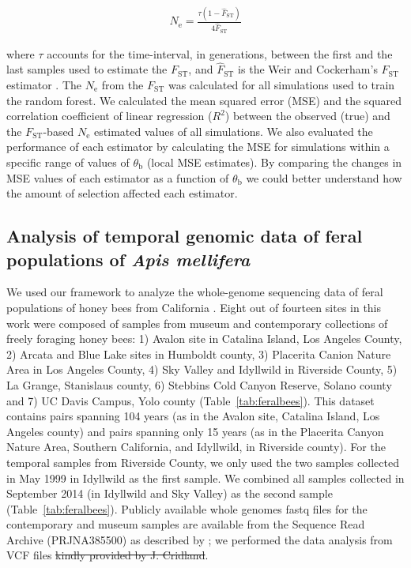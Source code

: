 \documentclass[a4paper, 12pt]{article}
\providecommand{\DIFaddtex}[1]{{\protect\color{blue}\uwave{#1}}} %
\providecommand{\DIFdeltex}[1]{{\protect\color{red}\sout{#1}}}                      %
\providecommand{\DIFaddbegin}{} %
\providecommand{\DIFaddend}{} %
\providecommand{\DIFdelbegin}{} %
\providecommand{\DIFdelend}{} %
\providecommand{\DIFadd}[1]{\texorpdfstring{\DIFaddtex{#1}}{#1}} %
\providecommand{\DIFdel}[1]{\texorpdfstring{\DIFdeltex{#1}}{}} %
\newcommand{\DIFscaledelfig}{0.5}
\newlength{\DIFdelgraphicswidth} %
\newlength{\DIFdelgraphicsheight} %
\newcommand{\DIFaddincludegraphics}[2][]{{\color{blue}\fbox{\DIFOincludegraphics[#1]{#2}}}} %
\newcommand{\DIFdelincludegraphics}[2][]{%
\sbox{\DIFdelgraphicsbox}{\DIFOincludegraphics[#1]{#2}}%
\settoboxwidth{\DIFdelgraphicswidth}{\DIFdelgraphicsbox} %
\settoboxtotalheight{\DIFdelgraphicsheight}{\DIFdelgraphicsbox} %
\scalebox{\DIFscaledelfig}{%
\parbox[b]{\DIFdelgraphicswidth}{\usebox{\DIFdelgraphicsbox}\\[-\baselineskip] \rule{\DIFdelgraphicswidth}{0em}}\llap{\resizebox{\DIFdelgraphicswidth}{\DIFdelgraphicsheight}{%
\setlength{\unitlength}{\DIFdelgraphicswidth}%
\begin{picture}(1,1)%
\thicklines\linethickness{2pt} %
{\color[rgb]{1,0,0}\put(0,0){\framebox(1,1){}}}%
{\color[rgb]{1,0,0}\put(0,0){\line( 1,1){1}}}%
{\color[rgb]{1,0,0}\put(0,1){\line(1,-1){1}}}%
\end{picture}%
}\hspace*{3pt}}} %
} %
\DeclareRobustCommand{\DIFaddbegin}{\DIFOaddbegin \let\includegraphics\DIFaddincludegraphics} %
\DeclareRobustCommand{\DIFaddend}{\DIFOaddend \let\includegraphics\DIFOincludegraphics} %
\DeclareRobustCommand{\DIFdelbegin}{\DIFOdelbegin \let\includegraphics\DIFdelincludegraphics} %
\DeclareRobustCommand{\DIFdelend}{\DIFOaddend \let\includegraphics\DIFOincludegraphics} %
\begin{document}
\begin{gather*}
\hat N_\mathrm{e} = \frac{\tau(1-\hat F_\mathrm{ST})}{4\hat F_\mathrm{ST} } 
\end{gather*}

\noindent where $\tau$ accounts for the time-interval, in generations, between the first and the last samples used to estimate the $F_\mathrm{ST}$, and $\hat F_\mathrm{ST}$ is the Weir and Cockerham's $F_\mathrm{ST}$ estimator \citep{Weir:1984dx}. The $N_\mathrm{e}$ from the $F_\mathrm{ST}$ was calculated for all simulations used to train the random forest. We calculated the mean squared error (MSE) and the squared correlation coefficient of linear regression ($R^2$) between the observed (true) and the $F_\mathrm{ST}$-based $N_\mathrm{e}$ estimated values of all simulations. We also evaluated the performance of each estimator by calculating the MSE for simulations within a specific range of values of $\theta_\mathrm{b}$ (local MSE estimates). By comparing the changes in MSE values of each estimator as a function of $\theta_\mathrm{b}$ we could better understand how the amount of selection affected each estimator.

\subsection*{Analysis of temporal genomic data of feral populations of \textit{Apis mellifera}} 

We used our framework to analyze the whole-genome sequencing data of feral populations of honey bees from California \citep{Cridland:2018fx}. Eight out of fourteen sites in this work were composed of samples from museum and contemporary collections of freely foraging honey bees: 1) Avalon site in Catalina Island, Los Angeles County, 2) Arcata and Blue Lake sites in Humboldt county, 3) Placerita Canion Nature Area in Los Angeles County, 4) Sky Valley and Idyllwild in Riverside County, 5) La Grange, Stanislaus county, 6) Stebbins Cold Canyon Reserve, Solano county and 7) UC Davis Campus, Yolo county (Table~\ref{tab:feralbees}). This dataset contains pairs spanning 104 years (as in the Avalon site, Catalina Island, Los Angeles county) and pairs spanning only 15 years (as in the Placerita Canyon Nature Area, Southern California, and Idyllwild, in Riverside county). For the temporal samples from Riverside County, we only used the two samples collected in May 1999 in Idyllwild as the first sample. We combined all samples collected in September 2014 (in Idyllwild and Sky Valley) as the second sample (Table~\ref{tab:feralbees}). Publicly available whole genomes fastq files for the contemporary and museum samples are available from the Sequence Read Archive (PRJNA385500) as described by \citet{Cridland:2018fx}; we performed the data analysis from VCF files \citep[the same files used in][]{Cridland:2018fx} \DIFdelbegin \DIFdel{kindly provided by J. Cridland}\DIFdelend \DIFaddbegin \DIFadd{available in \mbox{%
\citet{Pavinato:2021}}\hspace{0pt}%
}\DIFaddend .
\end{document}
